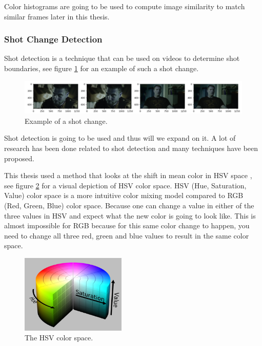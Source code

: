 \documentclass{article}
\begin{document}
Color histograms are going to be used to compute image similarity to match similar frames later in this thesis.

\subsubsection{Shot Change Detection}

Shot detection is a technique that can be used on videos to determine shot boundaries, see figure \ref{shotchange} for an example of such a shot change. 

\begin{figure}[H]
	\includegraphics[width=12cm]{images/shotchange.jpg}
	\centering
	\caption{Example of a shot change.}
	\label{shotchange}
\end{figure}

Shot detection is going to be used and thus will we expand on it. A lot of research has been done related to shot detection \cite{lienhart1998comparison} and many techniques have been proposed. 

This thesis used a method that looks at the shift in mean color in HSV space \cite{shao2015shot}, see figure \ref{hsvspace} for a visual depiction of HSV color space. HSV (Hue, Saturation, Value) color space is a more intuitive color mixing model compared to RGB (Red, Green, Blue) color space. Because one can change a value in either of the three values in HSV and expect what the new color is going to look like. This is almost impossible for RGB because for this same color change to happen, you need to change all three red, green and blue values to result in the same color space.

\begin{figure}[H]
	\includegraphics[width=5cm]{images/hsv.png}
	\centering
	\caption{The HSV color space.}
	\label{hsvspace}
\end{figure}
\end{document}
